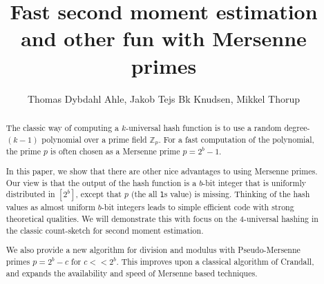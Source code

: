 

\title{Fast second moment estimation and other fun with Mersenne primes} 
\author{Thomas Dybdahl Ahle, Jakob Tejs Bk Knudsen, Mikkel Thorup}

\maketitle

\begin{abstract}
The classic way of computing a $k$-universal hash function is to use a random degree-$(k-1)$ polynomial over a prime field $\mathbb Z_p$.
For a fast computation of the polynomial, the prime $p$ is often chosen as a Mersenne prime $p=2^b-1$.

In this paper, we show that there are other nice advantages to using Mersenne primes.
Our view is that the output of the hash function is a $b$-bit integer that is uniformly distributed in $[2^b]$, except that $p$ (the all \texttt1s value) is missing.
Thinking of the hash values as almost uniform $b$-bit integers leads to simple efficient code with strong theoretical qualities.
We will demonstrate this with focus on the 4-universal hashing in the classic count-sketch for second moment estimation.

We also provide a new algorithm for division and modulus with Pseudo-Mersenne primes
$p=2^b-c$ for $c<\!< 2^b$.
This improves upon a classical algorithm of Crandall, and 
expands the availability and speed of Mersenne based techniques. %
\end{abstract}

\tableofcontents



















